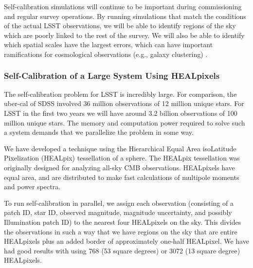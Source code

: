 \documentclass[12pt,preprint]{aastex}
\begin{document}
Self-calibration simulations will continue to be important during commissioning and regular survey operations.  By running simulations that match the conditions of the actual LSST observations, we will be able to identify regions of the sky which are poorly linked to the rest of the survey.  We will also be able to identify which spatial scales have the largest errors, which can have important ramifications for cosmological observations (e.g., galaxy clustering) \citep{Huterer13}. 







\subsubsection{Self-Calibration of a Large System Using HEALpixels}

The self-calibration problem for LSST is incredibly large.  For comparison, the uber-cal of SDSS involved 36 million observations of 12 million unique stars.  For LSST in the first two years we will have around 3.2 billion observations of 100 million unique stars.  The memory and computation power required to solve such a system demands that we parallelize the problem in some way.

We have developed a technique using the Hierarchical Equal Area isoLatitude Pixelization (HEALpix) tessellation of a sphere.  The HEALpix tessellation was originally designed for analyzing all-sky CMB observations.  HEALpixels have equal area, and are distributed to make fast calculations of multipole moments and power spectra.  

To run self-calibration in parallel, we assign each observation (consisting of a patch ID, star ID, observed magnitude, magnitude uncertainty, and possibly Illumination patch ID) to the nearest four HEALpixels on the sky.  This divides the observations in such a way that we have regions on the sky that are entire HEALpixels plus an added border of approximately one-half HEALpixel.  We have had good results with using 768 (53 square degrees) or 3072 (13 square degree) HEALpixels.  
\end{document}
